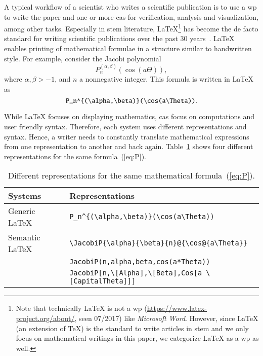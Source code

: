 A typical workflow of a scientist who writes a scientific publication is to use a \gls*{wp} to write the paper and one or more \gls*{cas} for verification, analysis and visualization, among other tasks. Especially in \gls*{stem} literature, \LaTeX\footnote{Note that technically \LaTeX{} is not a \gls*{wp} (\url{https://www.latex-project.org/about/}, seen 07/2017) like \textit{Microsoft Word}. However, since \LaTeX{} (an extension of \TeX) is the standard to write articles in \gls*{stem} and we only focus on mathematical writings in this paper, we categorize \LaTeX{} as a \gls*{wp} as well.} has become the de facto standard for writing scientific publications over the past 30 years~\parencites{LATEX:Standard}[559]{DigitalTypo}{Knuth}. \LaTeX{} enables printing of mathematical formulae in a structure similar to handwritten style. For example, consider the Jacobi polynomial~\parencite[18.3 in table 1]{NIST:DLMF}
\begin{equation}\label{eq:P}
P_n^{(\alpha , \beta)}(\cos(a\Theta)),
\end{equation}
where $\alpha, \beta > -1$, and $n$ a nonnegative integer. 
This formula is written in \LaTeX{} as
\begin{equation}\label{eq:P-tex}
\verb|P_n^{(\alpha,\beta)}(\cos(a\Theta))|.
\end{equation}

While \LaTeX{} focuses on displaying mathematics, \gls*{cas} focus on computations and user friendly syntax. Therefore, each system uses different representations and syntax. Hence, a writer needs to constantly translate mathematical expressions from one representation to another and back again. Table~\ref{tab:JacobiP-usecase} shows four different representations for the same formula~(\ref{eq:P}).

\begin{table}[ht]
	\centering
	\begin{tabular}{ll}
		\hline
		Systems & Representations \\
		\hline
		\hline
		Generic \LaTeX\ & \verb|P_n^{(\alpha,\beta)}(\cos(a\Theta))| \\ 
		Semantic \LaTeX\ & \verb|\JacobiP{\alpha}{\beta}{n}@{\cos@{a\Theta}}| \\
		\Maple & \verb|JacobiP(n,alpha,beta,cos(a*Theta))| \\ 
		\Mathematica & \verb|JacobiP[n,\[Alpha],\[Beta],Cos[a \[CapitalTheta]]]|\\
		\hline
	\end{tabular}
	\caption{Different representations for the same mathematical formula~(\ref{eq:P}).}
	\label{tab:JacobiP-usecase}
\end{table}

